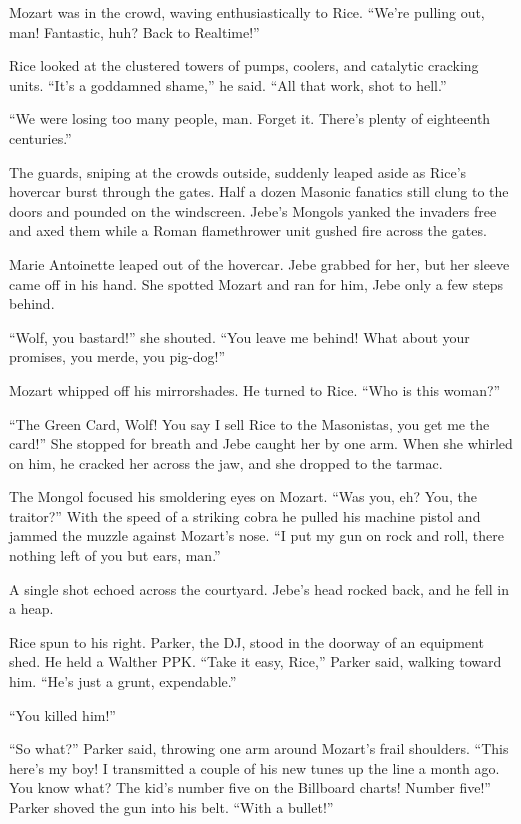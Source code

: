 Mozart was in the crowd, waving enthusiastically to Rice. “We’re pulling out, man! Fantastic, huh? Back to Realtime!”

Rice looked at the clustered towers of pumps, coolers, and catalytic cracking units. “It’s a goddamned shame,” he said. “All that work, shot to hell.”

“We were losing too many people, man. Forget it. There’s plenty of eighteenth centuries.”

The guards, sniping at the crowds outside, suddenly leaped aside as Rice’s hovercar burst through the gates. Half a dozen Masonic fanatics still clung to the doors and pounded on the windscreen. Jebe’s Mongols yanked the invaders free and axed them while a Roman flamethrower unit gushed fire across the gates.

Marie Antoinette leaped out of the hovercar. Jebe grabbed for her, but her sleeve came off in his hand. She spotted Mozart and ran for him, Jebe only a few steps behind.

“Wolf, you bastard!” she shouted. “You leave me behind! What about your promises, you merde, you pig-dog!”

Mozart whipped off his mirrorshades. He turned to Rice. “Who is this woman?”

“The Green Card, Wolf! You say I sell Rice to the Masonistas, you get me the card!” She stopped for breath and Jebe caught her by one arm. When she whirled on him, he cracked her across the jaw, and she dropped to the tarmac.

The Mongol focused his smoldering eyes on Mozart. “Was you, eh? You, the traitor?” With the speed of a striking cobra he pulled his machine pistol and jammed the muzzle against Mozart’s nose. “I put my gun on rock and roll, there nothing left of you but ears, man.”

A single shot echoed across the courtyard. Jebe’s head rocked back, and he fell in a heap.

Rice spun to his right. Parker, the DJ, stood in the doorway of an equipment shed. He held a Walther PPK. “Take it easy, Rice,” Parker said, walking toward him. “He’s just a grunt, expendable.”

“You killed him!”

“So what?” Parker said, throwing one arm around Mozart’s frail shoulders. “This here’s my boy! I transmitted a couple of his new tunes up the line a month ago. You know what? The kid’s number five on the Billboard charts! Number five!” Parker shoved the gun into his belt. “With a bullet!”


